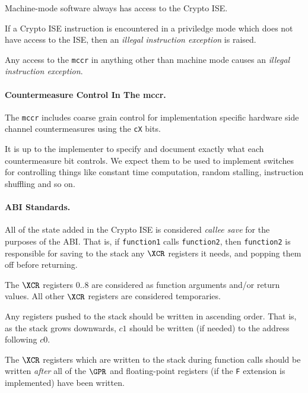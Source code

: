 Machine-mode software always has access to the Crypto ISE.

If a Crypto ISE instruction is encountered in a priviledge mode which
does not have access to the ISE, then an {\em illegal instruction exception}
is raised.

Any access to the {\tt mccr} in anything other than machine mode
causes an {\em illegal instruction exception}.

\paragraph{Countermeasure Control In The mccr.}

The {\tt mccr} includes coarse grain control for implementation specific
hardware side channel countermeasures using the {\tt cX} bits.

It is up to the implementer to specify and document exactly what each
countermeasure bit controls. We expect them to be used to implement
switches for controlling things like constant time computation, random
stalling, instruction shuffling and so on.

\paragraph{ABI Standards.}

All of the state added in the Crypto ISE is considered {\em callee save}
for the purposes of the ABI.
That is, if {\tt function1} calls 
{\tt function2}, then {\tt function2} is responsible for saving to the
stack any $\XCR$ registers it needs, and popping them off before returning.

The $\XCR$ registers $0..8$ are considered as function arguments
and/or return values. 
All other $\XCR$ registers are considered temporaries.

Any registers pushed to the stack should be written in ascending order.
That is, as the stack grows downwards, $c1$ should be written (if needed)
to the address following $c0$.

The $\XCR$ registers which are written to the stack during function calls
should be written {\em after} all of the $\GPR$ and floating-point registers
(if the {\tt F} extension is implemented) have been written.

